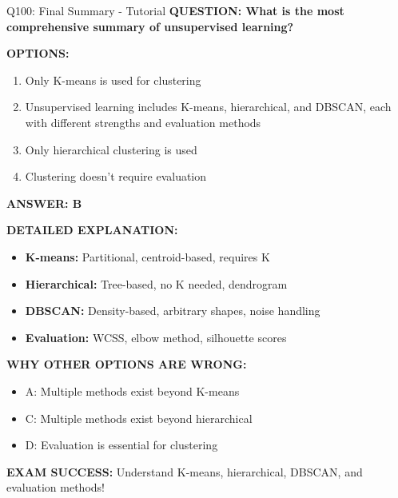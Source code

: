 \documentclass[8pt]{beamer}
\begin{document}
	\begin{frame}{Q100: Final Summary - Tutorial}
		\fontsize{6.5}{7.5}\selectfont
		\textbf{QUESTION: What is the most comprehensive summary of unsupervised learning?}
		
		\vspace{0.1cm}
		\textbf{OPTIONS:}
		\begin{enumerate}
			\item Only K-means is used for clustering
			\item Unsupervised learning includes K-means, hierarchical, and DBSCAN, each with different strengths and evaluation methods
			\item Only hierarchical clustering is used
			\item Clustering doesn't require evaluation
		\end{enumerate}
		
		\vspace{0.1cm}
		\textcolor{myblue}{\textbf{ANSWER: B}}
		
		\vspace{0.1cm}
		\textbf{DETAILED EXPLANATION:}
		\begin{itemize}
			\item \textbf{K-means:} Partitional, centroid-based, requires K
			\item \textbf{Hierarchical:} Tree-based, no K needed, dendrogram
			\item \textbf{DBSCAN:} Density-based, arbitrary shapes, noise handling
			\item \textbf{Evaluation:} WCSS, elbow method, silhouette scores
		\end{itemize}
		
		\vspace{0.1cm}
		\textcolor{myred}{\textbf{WHY OTHER OPTIONS ARE WRONG:}}
		\begin{itemize}
			\item \textcolor{myred}{A:} Multiple methods exist beyond K-means
			\item \textcolor{myred}{C:} Multiple methods exist beyond hierarchical
			\item \textcolor{myred}{D:} Evaluation is essential for clustering
		\end{itemize}
		
		\textcolor{myred}{\textbf{EXAM SUCCESS:}} Understand \textcolor{myblue}{K-means, hierarchical, DBSCAN, and evaluation methods}!
	\end{frame}
	
\end{document}
